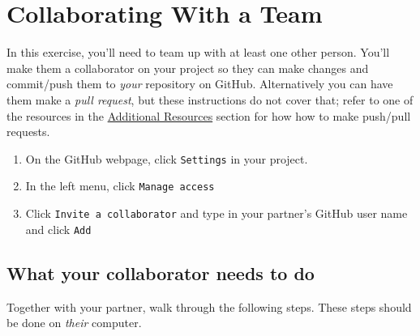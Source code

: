 \documentclass[12pt]{scrartcl}
\begin{document}
\section{Collaborating With a Team}

In this exercise, you'll need to team up with at least one other person.
You'll make them a collaborator on your project so they can make changes
and commit/push them to \emph{your} repository on GitHub.  Alternatively
you can have them make a \emph{pull request}, but these instructions do 
not cover that; refer to one of the resources in the 
\hyperref[section:additionalResources]{Additional Resources} section
for how how to make push/pull requests.

\begin{enumerate}
  \item On the GitHub webpage, click \texttt{Settings} in your project.
  \item In the left menu, click \texttt{Manage access}
  \item Click \texttt{Invite a collaborator} and type 
  in your partner's GitHub user name and click \texttt{Add}
\end{enumerate}

\subsection{What your collaborator needs to do}

Together with your partner, walk through the following steps.  These
steps should be done on \emph{their} computer.
\end{document}
